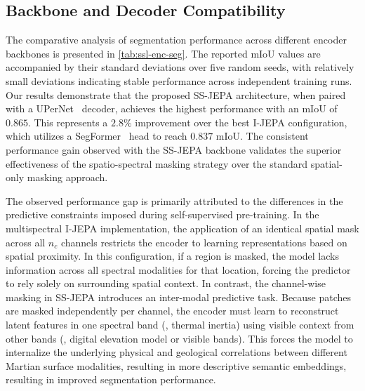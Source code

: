 \subsection{Backbone and Decoder Compatibility}
\label{sec:backbone-dec-compat}

The comparative analysis of segmentation performance across different encoder backbones is presented in \cref{tab:ssl-enc-seg}. The reported mIoU values are accompanied by their standard deviations over five random seeds, with relatively small deviations indicating stable performance across independent training runs. Our results demonstrate that the proposed SS-JEPA architecture, when paired with a UPerNet~\cite{DBLP:journals/corr/abs-1807-10221} decoder, achieves the highest performance with an mIoU of $0.865$. This represents a $2.8\%$ improvement over the best I-JEPA configuration, which utilizes a SegFormer~\cite{xie2021segformer} head to reach $0.837$ mIoU. The consistent performance gain observed with the SS-JEPA backbone validates the superior effectiveness of the spatio-spectral masking strategy over the standard spatial-only masking approach.

The observed performance gap is primarily attributed to the differences in the predictive constraints imposed during self-supervised pre-training. In the multispectral I-JEPA implementation, the application of an identical spatial mask across all \( n_c \) channels restricts the encoder to learning representations based on spatial proximity. In this configuration, if a region is masked, the model lacks information across all spectral modalities for that location, forcing the predictor to rely solely on surrounding spatial context. In contrast, the channel-wise masking in SS-JEPA introduces an inter-modal predictive task. Because patches are masked independently per channel, the encoder must learn to reconstruct latent features in one spectral band (\eg, thermal inertia) using visible context from other bands (\eg, digital elevation model or visible bands). This forces the model to internalize the underlying physical and geological correlations between different Martian surface modalities, resulting in more descriptive semantic embeddings, resulting in improved segmentation performance.



